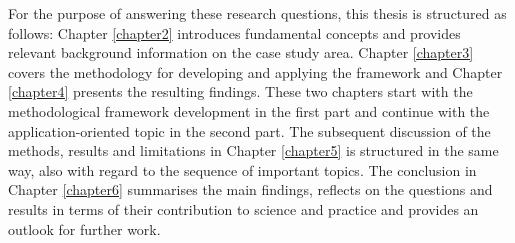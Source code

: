 \noindent For the purpose of answering these research questions, this thesis is structured as follows: Chapter \ref{chapter2} introduces fundamental concepts and provides relevant background information on the case study area. Chapter \ref{chapter3} covers the methodology for developing and applying the framework and Chapter \ref{chapter4} presents the resulting findings. These two chapters start with the methodological framework development in the first part and continue with the application-oriented topic in the second part. The subsequent discussion of the methods, results and limitations in Chapter \ref{chapter5} is structured in the same way, also with regard to the sequence of important topics. The conclusion in Chapter \ref{chapter6} summarises the main findings, reflects on the questions and results in terms of their contribution to science and practice and provides an outlook for further work.





 





